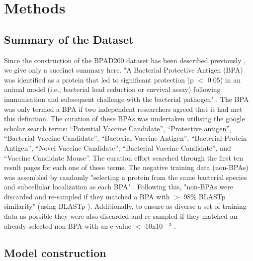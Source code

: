 \documentclass[10pt,journal,compsoc,twoside]{IEEEtran}
\begin{document}
\section{Methods}
\label{sec:methods}

\subsection{Summary of the Dataset}
\label{sec:methods1}

Since the construction of the BPAD200 dataset has been described previously \cite{heinson_2017}, we give only a succinct summary here. "A Bacterial Protective Antigen (BPA) was identified as a protein that led to significant protection (p \begin{math} < \end{math} 0.05) in an animal model (i.e., bacterial load reduction or survival assay) following immunisation and subsequent challenge with the bacterial pathogen" \cite{heinson_2017}. The BPA was only termed a BPA if two independent researchers agreed that it had met this definition. The curation of these BPAs was undertaken utilising the google scholar search terms: “Potential Vaccine Candidate”, “Protective antigen”, “Bacterial Vaccine Candidate”, “Bacterial Vaccine Antigen”, “Bacterial Protein Antigen”, “Novel Vaccine Candidate”, “Bacterial Vaccine Candidate”, and “Vaccine Candidate Mouse”. The curation effort searched through the first ten result pages for each one of these terms. The negative training data (non-BPAs) was assembled by randomly "selecting a protein from the same bacterial species and subcellular localization as each BPA" \cite{heinson_2017}. Following this, "non-BPAs were discarded and re-sampled if they matched a BPA with \begin{math} > \end{math} 98\% BLASTp similarity" \cite{heinson_2019} (using BLASTp \cite{blast}). Additionally, to ensure as diverse a set of training data as possible they were also discarded and re-sampled if they matched an already selected non-BPA with an e-value \begin{math} < \end{math} 10x10 \begin{math} ^{-3} \end{math} \cite{heinson_2017,blast}.


\subsection{Model construction}
\label{sec:methods2}
\end{document}
